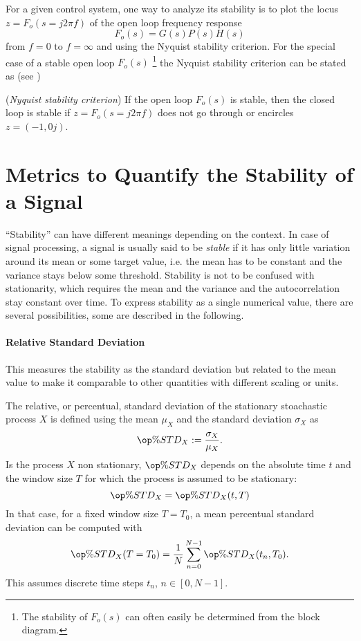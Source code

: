 For a given control system, one way to analyze its stability is to plot the locus $z=F_o(s=j2\pi f)$ of the open loop frequency response
\begin{equation}
F_o(s) = G(s)P(s)H(s)
\end{equation}
from $f=0$ to $f=\infty$ and using the Nyquist stability criterion.
For the special case of a stable open loop $F_o(s)$ \footnote{The stability of $F_o(s)$ can often easily be determined from the block diagram.} the Nyquist stability criterion can be stated as (see \cite[p.~111]{Foellinger2016})
\begin{definition}\label{def:Nyquist}
(\textit{Nyquist stability criterion}) If the open loop $F_o(s)$ is stable, then the closed loop is stable if $z=F_o(s=j2\pi f)$ does not go through or encircles $z=(-1,0j)$.
\end{definition}

\newpage
\section{Metrics to Quantify the Stability of a Signal}\label{sec:metrics}
``Stability'' can have different meanings depending on the context. In case of signal processing, a signal is usually said to be \textit{stable} if it has only little variation around its mean or some target value, i.e. the mean has to be constant and the variance stays below some threshold. 
Stability is not to be confused with stationarity, which requires the mean and the variance and the autocorrelation stay constant over time. \cite{Guthrie2020} 
To express stability as a single numerical value, there are several possibilities, some are described in the following.

\paragraph{Relative Standard Deviation}
This measures the stability as the standard deviation but related to the mean value to make it comparable to other quantities with different scaling or units.

The relative, or percentual, standard deviation of the stationary stoachastic process $X$ is defined using the mean $\mu_X$ and the standard deviation $\sigma_X$ as
\begin{equation}
\op{\%STD_X} := \frac{\sigma_X}{\mu_X}.
\end{equation}
Is the process $X$ non stationary, $\op{\%STD_X}$ depends on the absolute time $t$ and the window size $T$ for which the process is assumed to be stationary:
\begin{equation}
\op{\%STD_X} = \op{\%STD_X}(t,T)
\end{equation}
In that case, for a fixed window size $T=T_0$, a mean percentual standard deviation can be computed with 
\begin{equation}\label{eq:stdp}
\op{\%STD_X}(T=T_0) = \frac{1}{N} \sum_{n=0}^{N-1} \op{\%STD_X}(t_n,T_0).
\end{equation}
This assumes discrete time steps $t_n$, $n\in[0,N-1]$.

